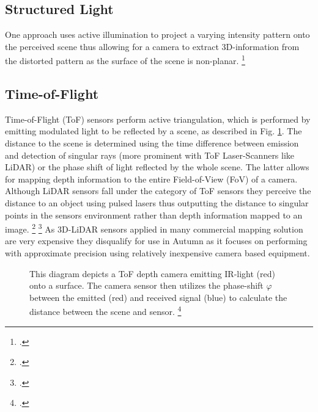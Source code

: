\subsection{Structured Light}
One approach uses active illumination to project a varying intensity pattern onto the perceived scene thus allowing for a camera to extract 3D-information from the distorted pattern as the surface of the scene is non-planar. \footcite{geng2011StructuredLight}

\subsection{Time-of-Flight}
Time-of-Flight (ToF) sensors perform active triangulation, which is performed by emitting modulated light to be reflected by a scene, as described in Fig. \ref{fig:activeTriangulation}. The distance to the scene is determined using the time difference between emission and detection of singular rays (more prominent with ToF Laser-Scanners like LiDAR) or the phase shift of light reflected by the whole scene. The latter allows for mapping depth information to the entire Field-of-View (FoV) of a camera. 
Although LiDAR sensors fall under the category of ToF sensors they perceive the distance to an object using pulsed lasers thus outputting
the distance to singular points in the sensors environment rather than depth information mapped to an image. \footcite{gokturk2004time} \footcite{velodyne2021LiDAR}
As 3D-LiDAR sensors applied in many commercial mapping solution are very expensive they disqualify for use in Autumn as it focuses on performing with approximate precision using relatively inexpensive camera based equipment. 

\begin{figure}
	\centering
	
	\caption{
		This diagram depicts a ToF depth camera emitting IR-light (red) onto a surface. The camera sensor then utilizes the phase-shift $\varphi$ between the emitted (red) and received signal (blue) to calculate the distance between the scene and sensor. \footcite{altuntas2021triangulation}
	}
	\label{fig:activeTriangulation}
\end{figure}


